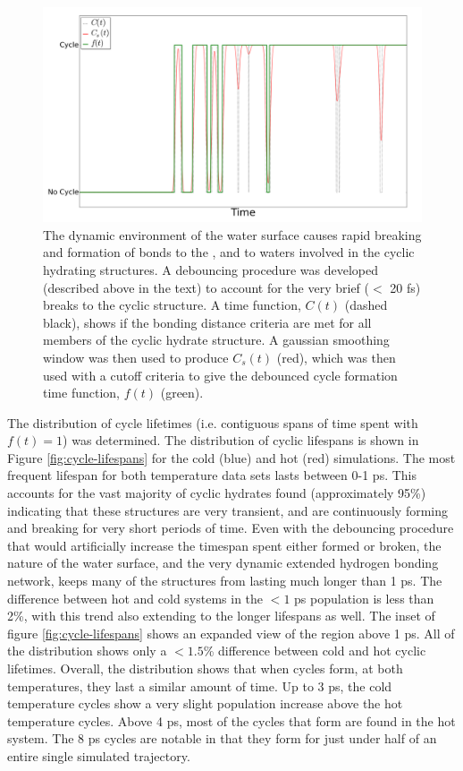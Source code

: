 \begin{figure}[h!]
	\begin{center}
		\includegraphics[scale=1.0]{images/cycles/cycle-debouncing-small.png}
		\caption{The dynamic environment of the water surface causes rapid breaking and formation of bonds to the \suldiox, and to waters involved in the cyclic hydrating structures. A debouncing procedure was developed (described above in the text) to account for the very brief ($<$ 20 fs) breaks to the cyclic structure. A time function, $C(t)$ (dashed black), shows if the bonding distance criteria are met for all members of the cyclic hydrate structure. A gaussian smoothing window was then used to produce $C_s(t)$ (red), which was then used with a cutoff criteria to give the debounced cycle formation time function, $f(t)$ (green).}
		\label{fig:debouncing}
	\end{center}
\end{figure}

The distribution of cycle lifetimes (i.e. contiguous spans of time spent with $f(t) = 1$) was determined. The distribution of cyclic lifespans is shown in Figure \ref{fig:cycle-lifespans} for the cold (blue) and hot (red) simulations. The most frequent lifespan for both temperature data sets lasts between 0-1 ps. This accounts for the vast majority of cyclic hydrates found (approximately 95\%) indicating that these structures are very transient, and are continuously forming and breaking for very short periods of time. Even with the debouncing procedure that would artificially increase the timespan spent either formed or broken, the nature of the water surface, and the very dynamic extended hydrogen bonding network, keeps many of the structures from lasting much longer than 1 ps. The difference between hot and cold systems in the $<1$ ps population is less than 2\%, with this trend also extending to the longer lifespans as well. The inset of figure \ref{fig:cycle-lifespans} shows an expanded view of the region above 1 ps. All of the distribution shows only a $<1.5$\% difference between cold and hot cyclic lifetimes. Overall, the distribution shows that when cycles form, at both temperatures, they last a similar amount of time. Up to 3 ps, the cold temperature cycles show a very slight population increase above the hot temperature cycles. Above 4 ps, most of the cycles that form are found in the hot system. The 8 ps cycles are notable in that they form  for just under half of an entire single simulated trajectory.

